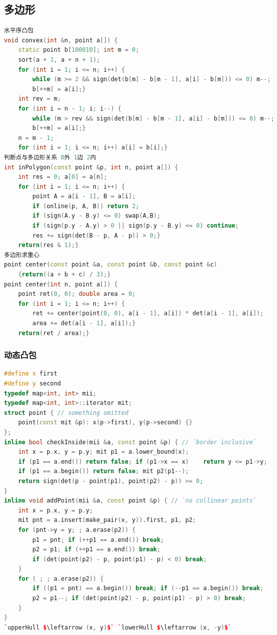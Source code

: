 \documentclass[landscape,a4paper]{article}
\begin{document}
\begin{spacing}{0.3}
\begin{multicols}{3}
\subsection{多边形}
\begin{lstlisting}[language=C++]
水平序凸包
void convex(int &n, point a[]) {
    static point b[100010]; int m = 0;
    sort(a + 1, a + n + 1);
    for (int i = 1; i <= n; i++) {
        while (m >= 2 && sign(det(b[m] - b[m - 1], a[i] - b[m])) <= 0) m--;
        b[++m] = a[i];}
    int rev = m;
    for (int i = n - 1; i; i--) {
        while (m > rev && sign(det(b[m] - b[m - 1], a[i] - b[m])) <= 0) m--;
        b[++m] = a[i];}
    n = m - 1;
    for (int i = 1; i <= n; i++) a[i] = b[i];}
判断点与多边形关系 0外 1边 2内
int inPolygon(const point &p, int n, point a[]) {
    int res = 0; a[0] = a[n];
    for (int i = 1; i <= n; i++) {
        point A = a[i - 1], B = a[i];
        if (online(p, A, B)) return 2;
        if (sign(A.y - B.y) <= 0) swap(A,B);
        if (sign(p.y - A.y) > 0 || sign(p.y - B.y) <= 0) continue;
        res += sign(det(B - p, A - p)) > 0;}
    return(res & 1);}
多边形求重心
point center(const point &a, const point &b, const point &c)
    {return((a + b + c) / 3);}
point center(int n, point a[]) {
    point ret(0, 0); double area = 0;
    for (int i = 1; i <= n; i++) {
        ret += center(point(0, 0), a[i - 1], a[i]) * det(a[i - 1], a[i]);
        area += det(a[i - 1], a[i]);}
    return(ret / area);}
\end{lstlisting}
\subsubsection{动态凸包}
\begin{lstlisting}[language=C++]
#define x first
#define y second
typedef map<int, int> mii;
typedef map<int, int>::iterator mit;
struct point { // something omitted
	point(const mit &p): x(p->first), y(p->second) {}
};
inline bool checkInside(mii &a, const point &p) { // `border inclusive`
	int x = p.x, y = p.y; mit p1 = a.lower_bound(x);
	if (p1 == a.end()) return false; if (p1->x == x)	return y <= p1->y;
	if (p1 == a.begin()) return false; mit p2(p1--);
	return sign(det(p - point(p1), point(p2) - p)) >= 0;
}
inline void addPoint(mii &a, const point &p) { // `no collinear points`
	int x = p.x, y = p.y;
	mit pnt = a.insert(make_pair(x, y)).first, p1, p2;
	for (pnt->y = y; ; a.erase(p2)) {
		p1 = pnt; if (++p1 == a.end()) break;
		p2 = p1; if (++p1 == a.end()) break;
		if (det(point(p2) - p, point(p1) - p) < 0) break;
	}
	for ( ; ; a.erase(p2)) {
		if ((p1 = pnt) == a.begin()) break; if (--p1 == a.begin()) break;
		p2 = p1--; if (det(point(p2) - p, point(p1) - p) > 0) break;
	}
}
`upperHull $\leftarrow (x, y)$` `lowerHull $\leftarrow (x, -y)$`
\end{lstlisting}

\end{multicols}
\end{spacing}
\end{document}
